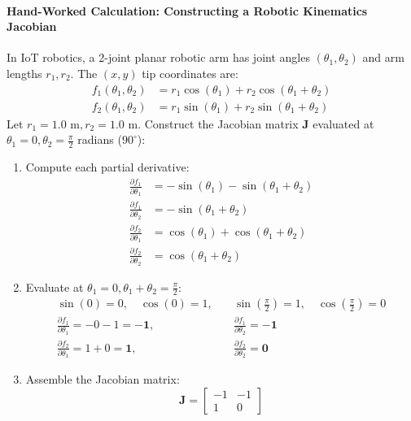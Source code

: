 \paragraph{Hand-Worked Calculation: Constructing a Robotic Kinematics Jacobian}
In IoT robotics, a 2-joint planar robotic arm has joint angles $(\theta_1, \theta_2)$ and arm lengths $r_1, r_2$. The $(x, y)$ tip coordinates are:
\begin{align*}
f_1(\theta_1, \theta_2) &= r_1 \cos(\theta_1) + r_2 \cos(\theta_1 + \theta_2) \\
f_2(\theta_1, \theta_2) &= r_1 \sin(\theta_1) + r_2 \sin(\theta_1 + \theta_2)
\end{align*}
Let $r_1 = 1.0\text{ m}, r_2 = 1.0\text{ m}$. Construct the Jacobian matrix $\mathbf{J}$ evaluated at $\theta_1 = 0, \theta_2 = \frac{\pi}{2}$ radians ($90^\circ$):
\begin{enumerate}
    \item Compute each partial derivative:
    \begin{align*}
    \frac{\partial f_1}{\partial \theta_1} &= -\sin(\theta_1) - \sin(\theta_1 + \theta_2) \\
    \frac{\partial f_1}{\partial \theta_2} &= -\sin(\theta_1 + \theta_2) \\
    \frac{\partial f_2}{\partial \theta_1} &= \cos(\theta_1) + \cos(\theta_1 + \theta_2) \\
    \frac{\partial f_2}{\partial \theta_2} &= \cos(\theta_1 + \theta_2)
    \end{align*}

    \item Evaluate at $\theta_1 = 0, \theta_1 + \theta_2 = \frac{\pi}{2}$:
    \begin{align*}
    \sin(0) = 0, \quad \cos(0) = 1, \quad &\sin\left(\frac{\pi}{2}\right) = 1, \quad \cos\left(\frac{\pi}{2}\right) = 0 \\
    \frac{\partial f_1}{\partial \theta_1} = -0 - 1 = \mathbf{-1}, \quad &\frac{\partial f_1}{\partial \theta_2} = \mathbf{-1} \\
    \frac{\partial f_2}{\partial \theta_1} = 1 + 0 = \mathbf{1}, \quad &\frac{\partial f_2}{\partial \theta_2} = \mathbf{0}
    \end{align*}

    \item Assemble the Jacobian matrix:
    \begin{equation*}
    \mathbf{J} = \begin{bmatrix} -1 & -1 \\ 1 & 0 \end{bmatrix}
    \end{equation*}
\end{enumerate}
